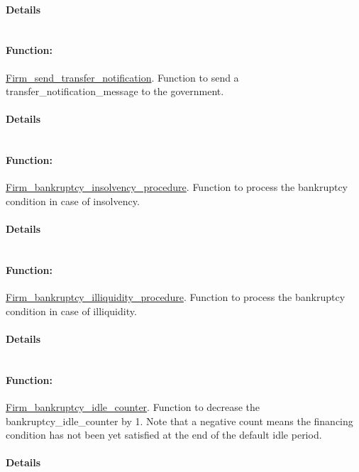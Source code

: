 \documentclass[a4paper,11pt]{article}
\begin{document}
\paragraph{Details}
\begin{verbatim}
\end{verbatim}
\paragraph{Function:}\url{Firm_send_transfer_notification}.
Function to send a transfer\_notification\_message to the government.
\paragraph{Details}
\begin{verbatim}
\end{verbatim}
\paragraph{Function:}\url{Firm_bankruptcy_insolvency_procedure}.
Function to process the bankruptcy condition in case of insolvency.
\paragraph{Details}
\begin{verbatim}
\end{verbatim}
\paragraph{Function:}\url{Firm_bankruptcy_illiquidity_procedure}.
Function to process the bankruptcy condition in case of illiquidity.
\paragraph{Details}
\begin{verbatim}
\end{verbatim}
\paragraph{Function:}\url{Firm_bankruptcy_idle_counter}.
Function to decrease the bankruptcy\_idle\_counter by 1. 
Note that a negative count means the financing condition has not been yet satisfied at the end of the default idle period.
\paragraph{Details}
\begin{verbatim}
\end{verbatim}
\end{document}
